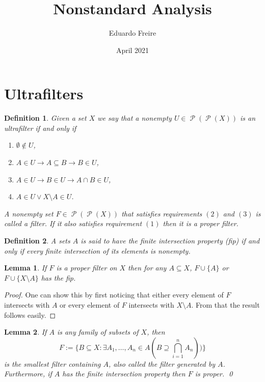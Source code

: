\documentclass[leqno]{article}
\title{Nonstandard Analysis}
\author{Eduardo Freire}
\date{April 2021}
\newtheorem{lemma}{Lemma}[section]
\newtheorem{definition}{Definition}[section]
\theoremstyle{remark}
\newcommand{\paren}[1]{\left( #1 \right)}
\newcommand{\set}[1]{\{#1\}}
\newcommand{\limplies}{\rightarrow}
\newcommand{\powerset}[1]{\operatorname{\mathcal{P}}\paren{#1}}
\begin{document}
\maketitle

\section{Ultrafilters}

\begin{definition} \label{def:filter}
    Given a set $X$ we say that a nonempty $U \in \powerset{\powerset{X}}$ is an ultrafilter if and only if
    \begin{enumerate}
        \item $\emptyset \notin U$,
        \item $A \in U \limplies A \subseteq B \limplies B \in U$,
        \item $A \in U \limplies B \in U \limplies A \cap B \in U$,
        \item $A \in U \lor X \setminus A \in U$.
    \end{enumerate}
    
    A nonempty set $F \in \powerset{\powerset{X}}$ that satisfies requirements $(2)$ and $(3)$ is called a filter. If it also satisfies requirement $(1)$ then it is a proper filter. 
\end{definition}


\begin{definition}
    A sets $A$ is said to have the finite intersection property (fip) if and only if every finite intersection of its elements is nonempty.
\end{definition}

\begin{lemma} \label{lemma:fip_insert_of_proper}
    If $F$ is a proper filter on $X$ then for any $A \subseteq X$, $F \cup \set{A}$ or $F \cup \set{X \setminus A}$ has the fip.
\end{lemma}

\begin{proof}
    One can show this by first noticing that either every element of $F$ intersects with $A$ or every element of $F$ intersects with $X \setminus A$. From that the result follows easily.
\end{proof}

\begin{lemma} \label{lemma:smallest_filter_containing}
    If $A$ is any family of subsets of $X$, then
    \begin{equation*}
        F := \set{B \subseteq X : \exists A_1, \dots, A_n \in A (B \supseteq \bigcap_{i=1}^n A_n))}
    \end{equation*} is the smallest filter containing $A$, also called the filter generated by $A$. Furthermore, if $A$ has the finite intersection property then $F$ is proper. \qed
\end{lemma}
\end{document}
